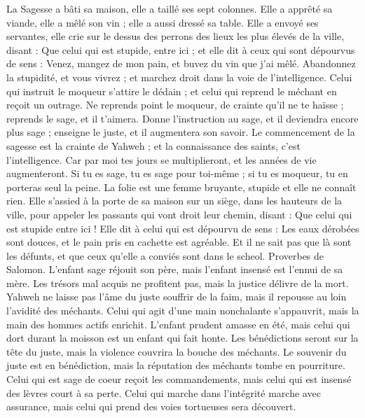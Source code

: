 \begin{multicols}{2}
\VerseOne{}La Sagesse a bâti sa maison, elle a taillé ses sept colonnes.
Elle a apprêté sa viande, elle a mêlé son vin ; elle a aussi dressé sa table.
Elle a envoyé ses servantes, elle crie sur le dessus des perrons des lieux les plus élevés de la ville, disant :
Que celui qui est stupide, entre ici ; et elle dit à ceux qui sont dépourvus de sens :
Venez, mangez de mon pain, et buvez du vin que j'ai mêlé.
Abandonnez la stupidité, et vous vivrez ; et marchez droit dans la voie de l’intelligence.
Celui qui instruit le moqueur s’attire le dédain ; et celui qui reprend le méchant en reçoit un outrage.
Ne reprends point le moqueur, de crainte qu'il ne te haïsse ; reprends le sage, et il t'aimera.
Donne l’instruction au sage, et il deviendra encore plus sage ; enseigne le juste, et il augmentera son savoir.
Le commencement de la sagesse est la crainte de Yahweh ; et la connaissance des saints, c'est l’intelligence.
Car par moi tes jours se multiplieront, et les années de vie augmenteront.
Si tu es sage, tu es sage pour toi-même ; si tu es moqueur, tu en porteras seul la peine.
La folie est une femme bruyante, stupide et elle ne connaît rien.
Elle s'assied à la porte de sa maison sur un siège, dans les hauteurs de la ville,
pour appeler les passants qui vont droit leur chemin, disant :
Que celui qui est stupide entre ici ! Elle dit à celui qui est dépourvu de sens :
Les eaux dérobées sont douces, et le pain pris en cachette est agréable.
Et il ne sait pas que là sont les défunts, et que ceux qu'elle a conviés sont dans le scheol.
\VerseOne{}Proverbes de Salomon. L'enfant sage réjouit son père, mais l'enfant insensé est l'ennui de sa mère.
Les trésors mal acquis ne profitent pas, mais la justice délivre de la mort.
Yahweh ne laisse pas l'âme du juste souffrir de la faim, mais il repousse au loin l’avidité des méchants.
Celui qui agit d’une main nonchalante s’appauvrit, mais la main des hommes actifs enrichit.
L'enfant prudent amasse en été, mais celui qui dort durant la moisson est un enfant qui fait honte.
Les bénédictions seront sur la tête du juste, mais la violence couvrira la bouche des méchants.
Le souvenir du juste est en bénédiction, mais la réputation des méchants tombe en pourriture.
Celui qui est sage de coeur reçoit les commandements, mais celui qui est insensé des lèvres court à sa perte.
Celui qui marche dans l'intégrité marche avec assurance, mais celui qui prend des voies tortueuses sera découvert.

\end{multicols}
